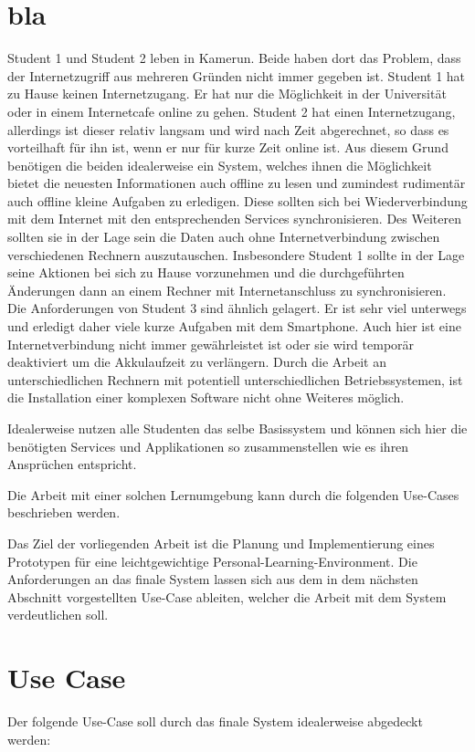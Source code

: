 \section{bla}
Student 1 und Student 2 leben in Kamerun. Beide haben dort das Problem, dass der Internetzugriff aus mehreren Gründen nicht immer gegeben ist. Student 1 hat zu Hause keinen Internetzugang. Er hat nur die Möglichkeit in der Universität oder in einem Internetcafe online zu gehen. Student 2 hat einen Internetzugang, allerdings ist dieser relativ langsam und wird nach Zeit abgerechnet, so dass es vorteilhaft für ihn ist, wenn er nur für kurze Zeit online ist. Aus diesem Grund benötigen die beiden idealerweise ein System, welches ihnen die Möglichkeit bietet die neuesten Informationen auch offline zu lesen und zumindest rudimentär auch offline kleine Aufgaben zu erledigen. Diese sollten sich bei Wiederverbindung mit dem Internet mit den entsprechenden Services synchronisieren. Des Weiteren sollten sie in der Lage sein die Daten auch ohne Internetverbindung zwischen verschiedenen Rechnern auszutauschen. Insbesondere Student 1 sollte in der Lage seine Aktionen bei sich zu Hause vorzunehmen und die durchgeführten Änderungen dann an einem Rechner mit Internetanschluss zu synchronisieren. Die Anforderungen von Student 3 sind ähnlich gelagert. Er ist sehr viel unterwegs und erledigt daher viele kurze Aufgaben mit dem Smartphone. Auch hier ist eine Internetverbindung nicht immer gewährleistet ist oder sie wird temporär deaktiviert um die Akkulaufzeit zu verlängern. Durch die Arbeit an unterschiedlichen Rechnern mit potentiell unterschiedlichen Betriebssystemen, ist die Installation einer komplexen Software nicht ohne Weiteres möglich.

Idealerweise nutzen alle Studenten das selbe Basissystem und können sich hier die benötigten Services und Applikationen so zusammenstellen wie es ihren Ansprüchen entspricht.


Die Arbeit mit einer solchen Lernumgebung kann durch die folgenden Use-Cases beschrieben werden.

Das Ziel der vorliegenden Arbeit ist die Planung und Implementierung eines Prototypen für eine leichtgewichtige Personal-Learning-Environment. Die Anforderungen an das finale System lassen sich aus dem in dem nächsten Abschnitt vorgestellten Use-Case ableiten, welcher die Arbeit mit dem System verdeutlichen soll.

\section{Use Case}
Der folgende Use-Case soll durch das finale System idealerweise abgedeckt werden:

